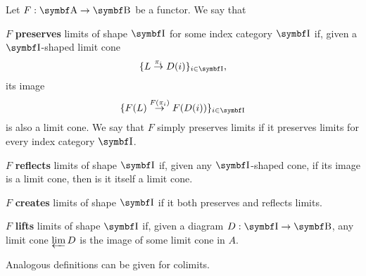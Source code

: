 \begin{definition}\label{def:categorical_limit_preservation}\cite[definitions 5.3.1, 5.3.5]{Leinster2014}
  Let \( F: \Bold A \to \Bold B \) be a functor. We say that
  \begin{defenum}
     \( F \) \textbf{preserves} limits of shape \( \Bold I \) for some index category \( \Bold I \) if, given a \( \Bold I \)-shaped limit cone
    \begin{equation*}
     \{ L \overset {\pi_i} \to D(i) \}_{i \in \Bold I},
    \end{equation*}
    its image
    \begin{equation*}
      \{ F(L) \overset {F(\pi_i)} \to F(D(i)) \}_{i \in \Bold I}
    \end{equation*}
    is also a limit cone. We say that \( F \) simply preserves limits if it preserves limits for every index category \( \Bold I \).

     \( F \) \textbf{reflects} limits of shape \( \Bold I \) if, given any \( \Bold I \)-shaped cone, if its image is a limit cone, then is it itself a limit cone.

     \( F \) \textbf{creates} limits of shape \( \Bold I \) if it both preserves and reflects limits.

     \( F \) \textbf{lifts} limits of shape \( \Bold I \) if, given a diagram \( D: \Bold I \to \Bold B \), any limit cone \( \varprojlim D \) is the image of some limit cone in \( A \).
  \end{defenum}
\end{definition}

\begin{note}\label{note:categorical_colimit_preservation}
  Analogous definitions can be given for colimits.
\end{note}
